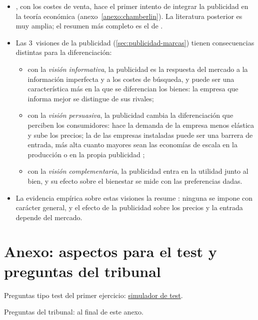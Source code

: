 \documentclass[11pt]{article}
\begin{document}
\begin{itemize}
\item {}, con los costes de venta, hace el primer intento de integrar la publicidad en la teoría económica (anexo~\ref{anexo:chamberlin}). La literatura posterior es muy amplia; el resumen más completo es el de \textcite{Bagwell2007Economic}.
\item Las 3~visiones de la publicidad (\ref{sec:publicidad-marcas}) tienen consecuencias distintas para la diferenciación:
  \begin{itemize}
  \item con la \emph{visión informativa}, la publicidad es la respuesta del mercado a la información imperfecta y a los costes de búsqueda, y puede ser una característica más en la que se diferencian los bienes: la empresa que informa mejor se distingue de sus rivales;
  \item con la \emph{visión persuasiva}, la publicidad cambia la diferenciación que perciben los consumidores: hace la demanda de la empresa menos elástica y sube los precios; la de las empresas instaladas puede ser una barrera de entrada, más alta cuanto mayores sean las economías de escala en la producción o en la propia publicidad ;
  \item con la \emph{visión complementaria}, la publicidad entra en la utilidad junto al bien, y su efecto sobre el bienestar se mide con las preferencias dadas\nocite{BeckerMurphy1993Simple}.
  \end{itemize}
\item La evidencia empírica sobre estas visiones la resume \textcite{Bagwell2007Economic}: ninguna se impone con carácter general, y el efecto de la publicidad sobre los precios y la entrada depende del mercado.
\end{itemize}

\section{Anexo: aspectos para el test y preguntas del tribunal}\label{anexo:test}

\begin{anotaciones}
Preguntas tipo test del primer ejercicio: \href{https://www.victorgutierrezmarcos.es/oposicion/temario/primer-ejercicio/test/simulador.html?tema=3.A.18}{simulador de test}.

Preguntas del tribunal: al final de este anexo.
\end{anotaciones}
\end{document}
